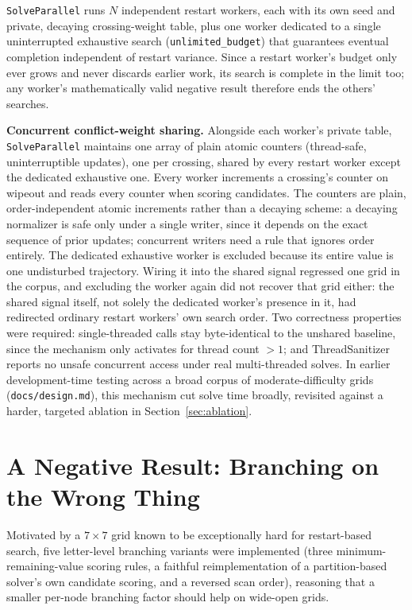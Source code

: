 \documentclass[conference]{IEEEtran}
\begin{document}
\texttt{SolveParallel} runs $N$ independent restart workers, each with its own seed and private, decaying crossing-weight table, plus one worker dedicated to a single uninterrupted exhaustive search (\texttt{unlimited\_budget}) that guarantees eventual completion independent of restart variance. Since a restart worker's budget only ever grows and never discards earlier work, its search is complete in the limit too; any worker's mathematically valid negative result therefore ends the others' searches.

\textbf{Concurrent conflict-weight sharing.} Alongside each worker's private table, \texttt{SolveParallel} maintains one array of plain atomic counters (thread-safe, uninterruptible updates), one per crossing, shared by every restart worker except the dedicated exhaustive one. Every worker increments a crossing's counter on wipeout and reads every counter when scoring candidates. The counters are plain, order-independent atomic increments rather than a decaying scheme: a decaying normalizer is safe only under a single writer, since it depends on the exact sequence of prior updates; concurrent writers need a rule that ignores order entirely. The dedicated exhaustive worker is excluded because its entire value is one undisturbed trajectory. Wiring it into the shared signal regressed one grid in the corpus, and excluding the worker again did not recover that grid either: the shared signal itself, not solely the dedicated worker's presence in it, had redirected ordinary restart workers' own search order. Two correctness properties were required: single-threaded calls stay byte-identical to the unshared baseline, since the mechanism only activates for thread count $>1$; and ThreadSanitizer reports no unsafe concurrent access under real multi-threaded solves. In earlier development-time testing across a broad corpus of moderate-difficulty grids (\texttt{docs/design.md}), this mechanism cut solve time broadly, revisited against a harder, targeted ablation in Section~\ref{sec:ablation}.

\section{A Negative Result: Branching on the Wrong Thing}
\label{sec:negative}

Motivated by a $7\times7$ grid known to be exceptionally hard for restart-based search, five letter-level branching variants were implemented (three minimum-remaining-value scoring rules, a faithful reimplementation of a partition-based solver's own candidate scoring, and a reversed scan order), reasoning that a smaller per-node branching factor should help on wide-open grids.
\end{document}
